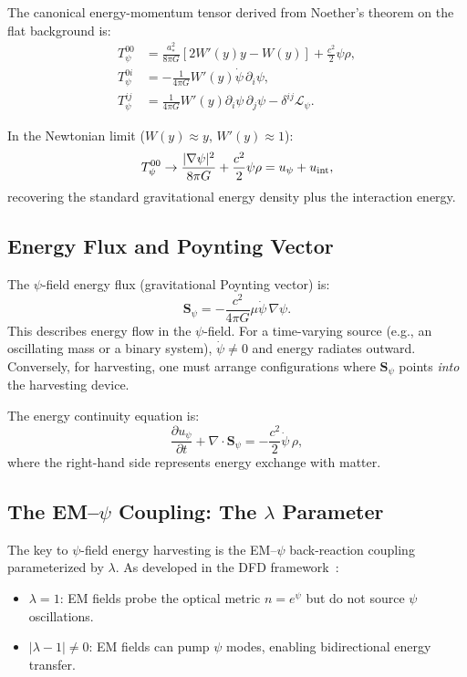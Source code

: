 \documentclass[aps,prd,twocolumn,showpacs,preprintnumbers,superscriptaddress,nofootinbib]{revtex4-2}
\newcommand{\astar}{a_*}
\newcommand{\Wfunc}{W}
\newcommand{\mufunction}{\mu}
\newcommand{\psidot}{\dot{\psi}}
\begin{document}
The canonical energy-momentum tensor derived from Noether's theorem on the
flat background is:
\begin{align}
T^{00}_\psi &= \frac{\astar^2}{8\pi G}\left[2\Wfunc'(y)y - \Wfunc(y)\right] + \frac{c^2}{2}\psi\rho, \label{eq:T00}\\
T^{0i}_\psi &= -\frac{1}{4\pi G}\Wfunc'(y)\psidot\,\partial_i\psi, \label{eq:T0i}\\
T^{ij}_\psi &= \frac{1}{4\pi G}\Wfunc'(y)\partial_i\psi\,\partial_j\psi - \delta^{ij}\mathcal{L}_\psi. \label{eq:Tij}
\end{align}

In the Newtonian limit ($\Wfunc(y)\approx y$, $\Wfunc'(y)\approx 1$):
\begin{equation}
T^{00}_\psi \to \frac{|\nabla\psi|^2}{8\pi G} + \frac{c^2}{2}\psi\rho = u_\psi + u_{\rm int},
\end{equation}
recovering the standard gravitational energy density plus the interaction energy.

\subsection{Energy Flux and Poynting Vector}\label{sec:poynting}

The $\psi$-field energy flux (gravitational Poynting vector) is:
\begin{equation}\label{eq:poynting}
\mathbf{S}_\psi = -\frac{c^2}{4\pi G}\mufunction\psidot\,\nabla\psi.
\end{equation}
This describes energy flow in the $\psi$-field.  For a time-varying source
(e.g., an oscillating mass or a binary system), $\psidot \neq 0$ and
energy radiates outward.  Conversely, for harvesting, one must arrange
configurations where $\mathbf{S}_\psi$ points \emph{into} the harvesting
device.

The energy continuity equation is:
\begin{equation}
\frac{\partial u_\psi}{\partial t} + \nabla\cdot\mathbf{S}_\psi = -\frac{c^2}{2}\psidot\,\rho,
\end{equation}
where the right-hand side represents energy exchange with matter.

\subsection{The EM--$\psi$ Coupling: The $\lambda$ Parameter}\label{sec:lambda}

The key to $\psi$-field energy harvesting is the EM--$\psi$ back-reaction
coupling parameterized by $\lambda$.  As developed in the DFD
framework~\cite{Alcock2025DFD}:
\begin{itemize}
\item $\lambda = 1$: EM fields probe the optical metric $n = e^\psi$ but do
not source $\psi$ oscillations.
\item $|\lambda - 1| \neq 0$: EM fields can pump $\psi$ modes, enabling
bidirectional energy transfer.
\end{itemize}
\end{document}
